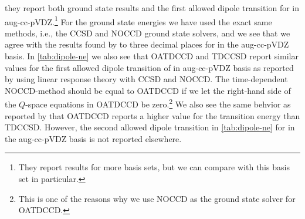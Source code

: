         \citeauthor{gauge-invariant-thomas-2} \cite{gauge-invariant-thomas-2}
        they report both ground state results and the first allowed dipole
        transition for  in aug-cc-pVDZ.\footnote{%
            They report results for more basis sets, but we can compare with
            this basis set in particular.
        }
        For the ground state energies we have used the exact same methods, i.e.,
        the CCSD and NOCCD ground state solvers, and we see that we agree with
        the results found by \citeauthor{gauge-invariant-thomas-2} to three
        decimal places for  in the aug-cc-pVDZ basis.
        In \autoref{tab:dipole-ne} we also see that OATDCCD and TDCCSD report
        similar values for the first allowed dipole transition of  in
        aug-cc-pVDZ basis as reported by \citeauthor{gauge-invariant-thomas-2}
        using linear response theory with CCSD and NOCCD.
        The time-dependent NOCCD-method should be equal to OATDCCD if we let the
        right-hand side of the $Q$-space equations in OATDCCD be
        zero.\footnote{%
            This is one of the reasons why we use NOCCD as the ground state
            solver for OATDCCD.
        }
        We also see the same behvior as reported by
        \citeauthor{gauge-invariant-thomas-2} that OATDCCD reports a higher
        value for the transition energy than TDCCSD.
        However, the second allowed dipole transition in \autoref{tab:dipole-ne}
        for  in the aug-cc-pVDZ basis is not reported elsewhere.
